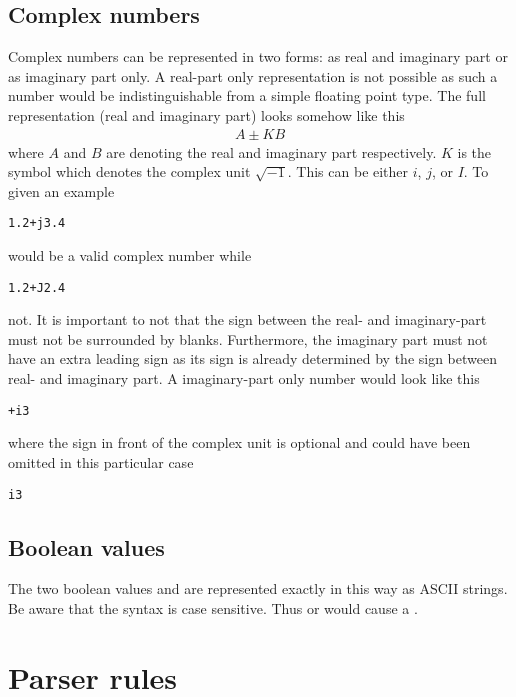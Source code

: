 \subsection{Complex numbers}

Complex numbers can be represented in two forms: as real and imaginary part 
or as imaginary part only. A real-part only representation is not possible 
as such a number would be indistinguishable from a simple floating point type. 
The full representation (real and imaginary part) looks somehow like this
\begin{align}
A \pm K B
\end{align}
where $A$ and $B$ are denoting the real and imaginary part respectively. 
$K$ is the symbol which denotes the complex unit $\sqrt{-1}$. This can be either
$i$, $j$, or $I$. To given an example 
\begin{verbatim}
1.2+j3.4
\end{verbatim}
would be a valid complex number while
\begin{verbatim}
1.2+J2.4
\end{verbatim}
not. It is important to not that the sign between the real- and imaginary-part 
must not be surrounded by blanks. Furthermore, the imaginary part must not have
an extra leading sign as its sign is already determined by the sign between
real- and imaginary part. 
A imaginary-part only number would look like this
\begin{verbatim}
+i3
\end{verbatim}
where the sign in front of the complex unit is optional and could have been 
omitted in this particular case 
\begin{verbatim}
i3
\end{verbatim}

\subsection{Boolean values}

The two boolean values  and  are represented exactly in
this way as ASCII strings. Be aware that the syntax is case sensitive. Thus 
 or  would cause a .

\section{Parser rules}



